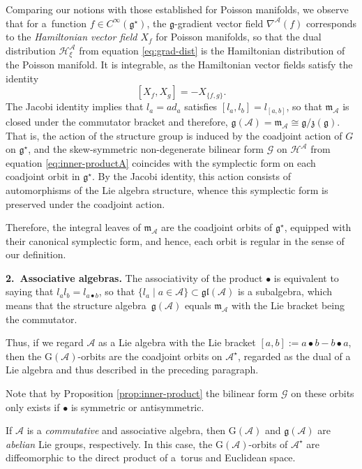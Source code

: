 \documentclass[pdftex]{sigma}
\numberwithin{equation}{section}
\newcommand{\hh}{\mathcal{H}}
\newcommand{\m}{\mathfrak{m}}
\newcommand{\G}{\mathrm{G}}
\newcommand{\g}{{\mathfrak{g}}}
\renewcommand{\m}{{\mathfrak m}}
\newcommand{\gl}{{\mathfrak{gl}}}
\newcommand{\cA}{\mathcal{A}}
\newcommand{\Gcal}{\mathcal{G}}
\begin{document}
Comparing our notions with those established for Poisson manifolds, we observe that for a~function $f \in C^\infty(\g^\star)$, the $\g$-gradient vector field $\nabla^{\cA}(f)$ corresponds to the {\em Hamiltonian vector field $X_f$} for Poisson manifolds, so that the dual distribution $\hh^\cA_\xi$ from equation \eqref{eq:grad-dist} is the Hamiltonian distribution of the Poisson manifold.
It is integrable, as the Hamiltonian vector fields satisfy the identity
\[
[X_f, X_g] = -X_{\{f,g\}}.
\]
The Jacobi identity implies that $l_a = ad_a$ satisfies $[l_a, l_b] = l_{[a,b]}$, so that $\m_\cA$ is closed under the commutator bracket and therefore, $\g(\cA) = \m_\cA \cong \g/\mathfrak{z}(\g)$.
That is, the action of the structure group is induced by the coadjoint action of $G$ on $\g^\star$, and the skew-symmetric non-degenerate bilinear form $\Gcal$ on $\hh^\cA$ from equation \eqref{eq:inner-productA} coincides with the symplectic form on each coadjoint orbit in $\g^\star$.
By the Jacobi identity, this action consists of automorphisms of the Lie algebra structure, whence this symplectic form is preserved under the coadjoint action.

Therefore, the integral leaves of $\m_\cA$ are the coadjoint orbits of $\g^\star$, equipped with their canonical symplectic form, and hence, each orbit is regular in the sense of our definition.

{\bf 2.\ Associative algebras.} The associativity of the product $\bullet$ is equivalent to saying that $l_a l_b  = l_{a\bullet b}$, so that $\{l_a \mid a \in \cA\} \subset \gl(\cA)$ is a subalgebra, which means that the structure algebra~$\g(\cA)$ equals $\m_\cA$ with the Lie bracket being the commutator.

Thus, if we regard $\cA$ as a Lie algebra with the Lie bracket $[a,b] := a \bullet b - b \bullet a$, then the $\G(\cA)$-orbits are the coadjoint orbits on $\cA^\star$, regarded as the dual of a Lie algebra and thus described in the preceding paragraph.

Note that by Proposition \ref{prop:inner-product} the bilinear form $\Gcal$ on these orbits only exists if $\bullet$ is symmetric or antisymmetric.

If $\cA$ is a {\em commutative} and associative algebra, then $\G(\cA)$ and $\g(\cA)$ are {\em abelian} Lie groups, respectively.
In this case, the $\G(\cA)$-orbits of $\cA^\star$ are diffeomorphic to the direct product of a~torus and Euclidean space.
\end{document}

